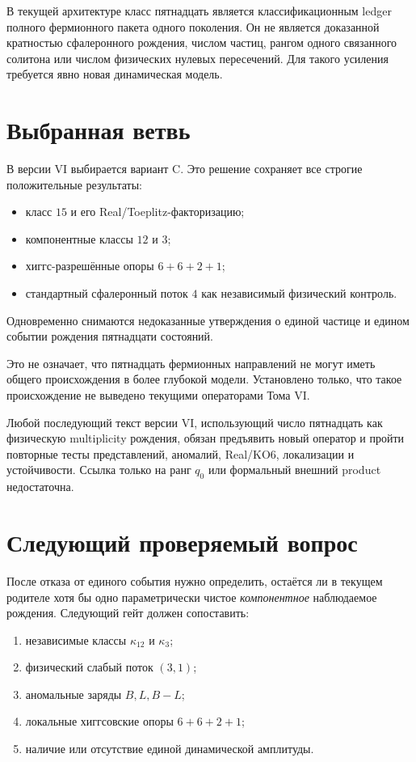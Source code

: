 \begin{theorem}
В текущей архитектуре класс пятнадцать является классификационным
ledger полного фермионного пакета одного поколения. Он не является
доказанной кратностью сфалеронного рождения, числом частиц, рангом
одного связанного солитона или числом физических нулевых пересечений.
Для такого усиления требуется явно новая динамическая модель.
\end{theorem}

\section{Выбранная ветвь}

В версии VI выбирается вариант C. Это решение сохраняет все строгие
положительные результаты:
\begin{itemize}
 \item класс $15$ и его Real/Toeplitz-факторизацию;
 \item компонентные классы $12$ и $3$;
 \item хиггс-разрешённые опоры $6+6+2+1$;
 \item стандартный сфалеронный поток $4$ как независимый физический
 контроль.
\end{itemize}
Одновременно снимаются недоказанные утверждения о единой частице и
едином событии рождения пятнадцати состояний.

Это не означает, что пятнадцать фермионных направлений не могут иметь
общего происхождения в более глубокой модели. Установлено только, что
такое происхождение не выведено текущими операторами Тома VI.

\begin{nogocriterion}
Любой последующий текст версии VI, использующий число пятнадцать как
физическую multiplicity рождения, обязан предъявить новый оператор и
пройти повторные тесты представлений, аномалий, Real/KO6, локализации и
устойчивости. Ссылка только на ранг $q_0$ или формальный внешний product
недостаточна.
\end{nogocriterion}

\section{Следующий проверяемый вопрос}

После отказа от единого события нужно определить, остаётся ли в текущем
родителе хотя бы одно параметрически чистое \emph{компонентное}
наблюдаемое рождения. Следующий гейт
должен сопоставить:
\begin{enumerate}
 \item независимые классы $\kappa_{12}$ и $\kappa_3$;
 \item физический слабый поток $(3,1)$;
 \item аномальные заряды $B,L,B-L$;
 \item локальные хиггсовские опоры $6+6+2+1$;
 \item наличие или отсутствие единой динамической амплитуды.
\end{enumerate}

